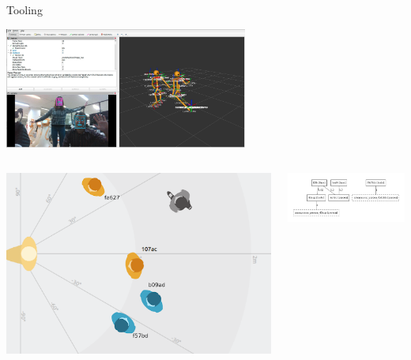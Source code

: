 \documentclass[xcolor=table]{beamer}
\begin{document}
\begin{frame}{Tooling}


    \begin{center}
    \includegraphics[width=8cm]{ros4hri/screenshot.jpg}
    \end{center}

    \vspace{1em}

    \begin{columns}
        \begin{column}{0.5\linewidth}
    \includegraphics[width=0.8\linewidth]{ros4hri/rqt_humans.png}
        \end{column}
        \begin{column}{0.5\linewidth}
    \includegraphics[width=6cm]{ros4hri/human_graph.png}
        \end{column}
    \end{columns}
\end{frame}
\end{document}
